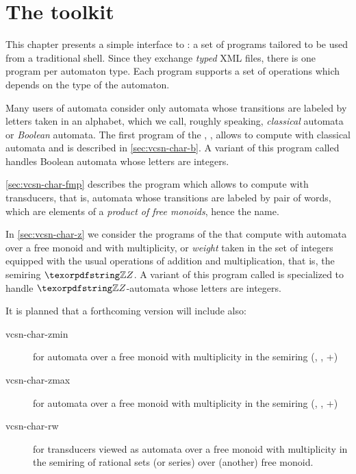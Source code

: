 \chapter{The \Vauc toolkit}
\label{sec:tafkit}

This chapter presents a simple interface to \Vauc: a set of programs
tailored to be used from a traditional shell.  Since they exchange
\emph{typed} XML files, there is one program per automaton type.  Each
program supports a set of operations which depends on the type of the
automaton.

Many users of automata consider only automata whose transitions are
labeled by letters taken in an alphabet, which we call, roughly
speaking, \emph{classical} automata or \emph{Boolean} automata.  The
first program of the \tafkit, , allows to compute
with classical automata and is described in \autoref{sec:vcsn-char-b}.
A variant of this program called  handles Boolean
automata whose letters are integers.

\autoref{sec:vcsn-char-fmp} describes the program  which
allows to compute with transducers, that is, automata whose
transitions are labeled by pair of words, which are elements of a
\emph{product of free monoids}, hence the name.

In \autoref{sec:vcsn-char-z} we consider the programs of the \tafkit
that compute with automata over a free monoid and with multiplicity,
or \emph{weight} taken in the set of integers equipped with the usual
operations of addition and multiplication, that is, the semiring $\Z$.
A variant of this program called  is specialized
to handle $\Z$-automata whose letters are integers.


\medskip


It is planned that a forthcoming version will include also:

\begin{description}
\item[vcsn-char-zmin] for automata over a free monoid with multiplicity in
  the semiring (\Z, \min, +)

\item[vcsn-char-zmax] for automata over a free monoid with multiplicity in the
  semiring (\Z, \max, +)

\item[vcsn-char-rw] for transducers viewed as automata over a free
  monoid with multiplicity in the semiring of rational sets (or
  series) over (another) free monoid.
\end{description}

